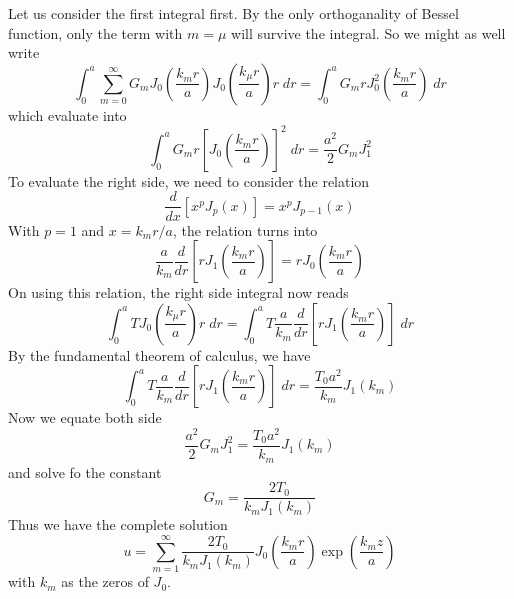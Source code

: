 \documentclass[../../main.tex]{subfiles}
\begin{document}
Let us consider the first integral first. By the only orthoganality of Bessel function, only the term with $m=\mu$ will survive the integral. So we might as well write 
\begin{equation*}
  \int_{0}^{a}\sum_{m=0}^{\infty}G_mJ_0\left(\frac{k_mr}{a}\right)J_0\left(\frac{k_\mu r}{a}\right)r\;dr=\int_{0}^{a}G_mrJ_0^2\left(\frac{k_mr}{a}\right)\;dr
\end{equation*}
which evaluate into 
\begin{equation*}
  \int_{0}^{a}G_mr\left[J_0\left(\frac{k_mr}{a}\right)\right]^2\;dr=\frac{a^2}{2}G_mJ_1^2
\end{equation*}
To evaluate the right side, we need to consider the relation
\begin{equation*}
  \frac{d}{dx}[x^pJ_p(x)]=x^pJ_{p-1}(x)
\end{equation*}
With $p=1$ and $x=k_mr/a$, the relation turns into 
\begin{equation*}
  \frac{a}{k_m}\frac{d}{dr}\left[rJ_1\left(\frac{k_m r}{a}\right)\right]=rJ_0\left(\frac{k_m r}{a}\right)
\end{equation*}
On using this relation, the right side integral now reads 
\begin{equation*}
  \int_{0}^{a}TJ_0\left(\frac{k_\mu r}{a}\right)r\;dr= \int_{0}^{a}T\frac{a}{k_m}\frac{d}{dr}\left[rJ_1\left(\frac{k_m r}{a}\right)\right]\;dr
\end{equation*}
By the fundamental theorem of calculus, we have 
\begin{equation*}
  \int_{0}^{a}T\frac{a}{k_m}\frac{d}{dr}\left[rJ_1\left(\frac{k_m r}{a}\right)\right]\;dr=\frac{T_0a^2}{k_m}J_1(k_m)
\end{equation*}
Now we equate both side 
\begin{equation*}
  \frac{a^2}{2}G_mJ_1^2=\frac{T_0a^2}{k_m}J_1(k_m)
\end{equation*}
and solve fo the constant
\begin{equation*}
  G_m=\frac{2T_0}{k_mJ_1(k_m)}
\end{equation*}
Thus we have the complete solution 
\begin{equation*}
  u=\sum_{m=1}^{\infty}\frac{2T_0}{k_mJ_1(k_m)}J_0\left(\frac{k_mr}{a}\right)\exp\left(\frac{k_mz}{a}\right)
\end{equation*}
with $k_m$ as the zeros of $J_0$.
\end{document}
